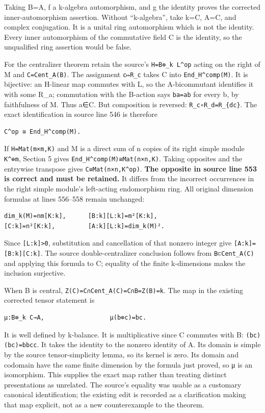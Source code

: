Taking B=A, f a k-algebra automorphism, and g the identity proves the corrected inner-automorphism assertion. Without ``k-algebra'', take k=C, A=C, and complex conjugation. It is a unital ring automorphism which is not the identity. Every inner automorphism of the commutative field C is the identity, so the unqualified ring assertion would be false.

For the centralizer theorem retain the source's \texttt{H=B⊗\_k\ L\^{}op} acting on the right of M and \texttt{C=Cent\_A(B)}. The assignment \texttt{c↦R\_c} takes C into \texttt{End\_H\^{}comp(M)}. It is bijective: an H-linear map commutes with L, so the A-bicommutant identifies it with some R\_a; commutation with the B-action says \texttt{ba=ab} for every b, by faithfulness of M. Thus a∈C. But composition is reversed: \texttt{R\_c∘R\_d=R\_\{dc\}}. The exact identification in source line 546 is therefore

\begin{verbatim}
C^op ≅ End_H^comp(M).
\end{verbatim}

If \texttt{H=Mat(m×m,K)} and M is a direct sum of n copies of its right simple module \texttt{K\^{}⊕m}, Section 5 gives \texttt{End\_H\^{}comp(M)≅Mat(n×n,K)}. Taking opposites and the entrywise transpose gives \texttt{C≅Mat(n×n,K\^{}op)}. \textbf{The opposite in source line 553 is correct and must be retained.} It differs from the incorrect occurrences in the right simple module's left-acting endomorphism ring. All original dimension formulas at lines 556--558 remain unchanged:

\begin{verbatim}
dim_k(M)=nm[K:k],      [B:k][L:k]=m²[K:k],
[C:k]=n²[K:k],         [A:k][L:k]=dim_k(M)².
\end{verbatim}

Since \texttt{{[}L:k{]}\textgreater{}0}, substitution and cancellation of that nonzero integer give \texttt{{[}A:k{]}={[}B:k{]}{[}C:k{]}}. The source double-centralizer conclusion follows from \texttt{B⊂Cent\_A(C)} and applying this formula to C; equality of the finite k-dimensions makes the inclusion surjective.

When B is central, \texttt{Z(C)=C∩Cent\_A(C)=C∩B=Z(B)=k}. The map in the existing corrected tensor statement is

\begin{verbatim}
μ:B⊗_k C→A,                  μ(b⊗c)=bc.
\end{verbatim}

It is well defined by k-balance. It is multiplicative since C commutes with B: \texttt{(bc)(b\textquotesingle{}c\textquotesingle{})=bb\textquotesingle{}cc\textquotesingle{}}. It takes the identity to the nonzero identity of A. Its domain is simple by the source tensor-simplicity lemma, so its kernel is zero. Its domain and codomain have the same finite dimension by the formula just proved, so μ is an isomorphism. This supplies the exact map rather than treating distinct presentations as unrelated. The source's equality was usable as a customary canonical identification; the existing edit is recorded as a clarification making that map explicit, not as a new counterexample to the theorem.

